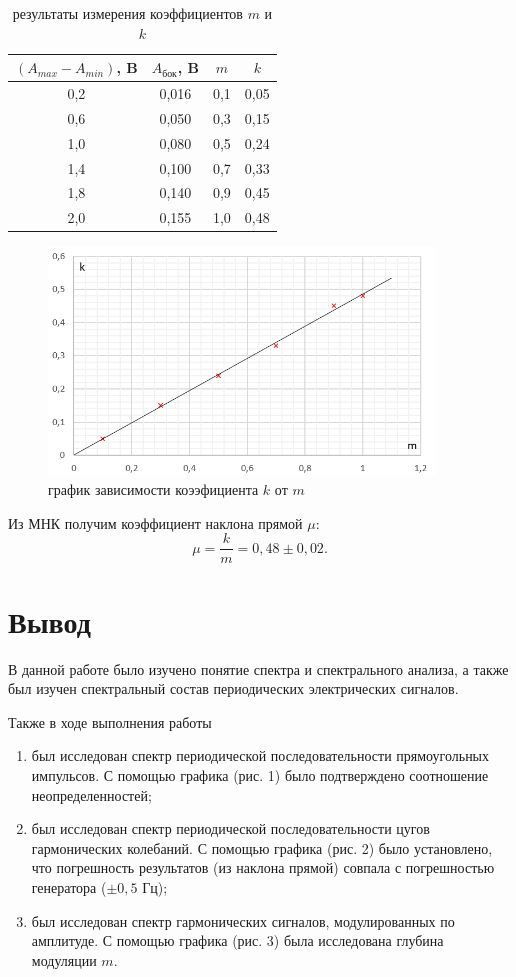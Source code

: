 \documentclass[a4paper]{article}
\theoremstyle{definition}
\theoremstyle{remark}
\begin{document}
\begin{table}[h!]
    \centering
    \caption{результаты измерения коэффициентов $m$ и $k$}
    \begin{tabular}{|c|c|c|c|}
    \hline
    $(A_{max} - A_{min})$, B & $A_{\text{бок}}$, B      &  $m$   &   $k$   \\ \hline
    0,2 & 0,016 & 0,1 & 0,05 \\ \hline
    0,6 & 0,050 & 0,3 & 0,15 \\ \hline
    1,0 & 0,080 & 0,5 & 0,24 \\ \hline
    1,4 & 0,100 & 0,7 & 0,33 \\ \hline
    1,8 & 0,140 & 0,9 & 0,45 \\ \hline
    2,0 & 0,155 & 1,0 & 0,48 \\ \hline
    \end{tabular}
    \end{table}

    \begin{figure}[t]
        \centering
        \includegraphics[width = 290pt]{image/graph3.png}
        \caption{график зависимости коээфициента $k$ от $m$}
    \end{figure}

\noindent Из МНК получим коэффициент наклона прямой $\mu$: $$\mu = \frac{k}{m} = 0,48 \pm 0,02.$$

\section{Вывод}

В данной работе было изучено понятие спектра и спектрального анализа, а также был изучен спектральный состав периодических электрических сигналов. 

\medskip

Также в ходе выполнения работы

\begin{enumerate}
    \item был исследован спектр периодической последовательности прямоугольных импульсов. С помощью графика (рис. 1) было подтверждено соотношение неопределенностей; 
    \item был исследован спектр периодической последовательности цугов гармонических колебаний. С помощью графика (рис. 2) было установлено, что погрешность результатов (из наклона прямой) совпала с погрешностью генератора ($\pm 0,5$ Гц);
    \item был исследован спектр гармонических сигналов, модулированных по амплитуде. С помощью графика (рис. 3) была исследована глубина модуляции $m$.
\end{enumerate}
\end{document}
